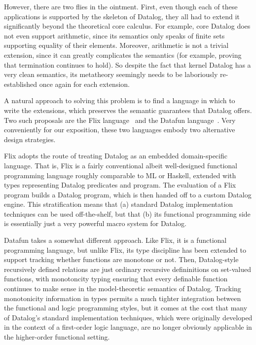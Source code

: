 However, there are two flies in the ointment. First, even though each
of these applications is supported by the skeleton of Datalog, they
all had to extend it significantly beyond the theoretical core
calculus.  For example, core Datalog does not even support arithmetic,
since its semantics only speaks of finite sets supporting equality of
their elements. Moreover, arithmetic is not a trivial extension, since
it can greatly complicates the semantics (for example, proving that
termination continues to hold). So despite the fact that kernel
Datalog has a very clean semantics, its metatheory seemingly needs to
be laboriously re-established once again for each extension.

A natural approach to solving this problem is to find a language in
which to write the extensions, which preserves the semantic guarantees
that Datalog offers. Two such proposals are the Flix
language~\cite{flix} and the Datafun language~\cite{datafun}.  Very
conveniently for our exposition, these two languages embody two
alternative design strategies.

Flix adopts the route of treating Datalog as an embedded
domain-specific language. That is, Flix is a fairly conventional
albeit well-designed functional programming language roughly
comparable to ML or Haskell, extended with types representing Datalog
predicates and program. The evaluation of a Flix program builds a
Datalog program, which is then handed off to a custom Datalog engine.
This stratification means that (a) standard Datalog implementation
techniques can be used off-the-shelf, but that (b) its functional
programming side is essentially just a very powerful macro system for
Datalog.

Datafun takes a somewhat different approach. Like Flix, it is a
functional programming language, but unlike Flix, its type discipline
has been extended to support tracking whether functions are monotone
or not. Then, Datalog-style recursively defined relations are just
ordinary recursive defininitions on set-valued functions, with
monotoncity typing ensuring that every definable function continues to
make sense in the model-theoretic semantics of Datalog. Tracking
monotonicity information in types permits a much tighter integration
between the functional and logic programming styles, but it comes at
the cost that many of Datalog's standard implementation techniques,
which were originally developed in the context of a first-order logic
language, are no longer obviously applicable in the higher-order
functional setting.

